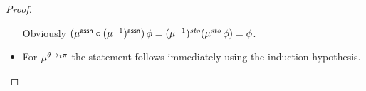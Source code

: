 \documentclass[12pt,a4paper]{report}
\newcommand{\ssto}{\nstyle{sto}}
\newcommand{\id}{\nstyle{id}}
\newcommand{\Fix}[1]{\nstyle{Fix}\,(#1)}
\begin{document}
\begin{proof}
\begin{itemize}
          Obviously $(\mu^\tassn\circ(\mu^{-1})^\tassn)\,\phi = (\mu^{-1})^\ssto(\mu^\ssto\,\phi) = \phi$.

    \item For $\mu^{\theta\rightarrow_t\pi}$ the statement follows immediately using the induction hypothesis.
%
%
  \end{itemize}
\end{proof}
\end{document}
